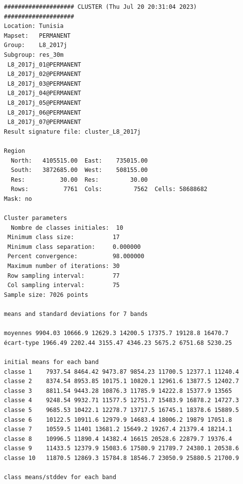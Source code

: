 \documentclass[environments,article,submit,pdftex,moreauthors]{Definitions/mdpi}
\begin{document}
\begin{scriptsize}
\begin{verbatim}
#################### CLUSTER (Thu Jul 20 20:31:04 2023) ####################
Location: Tunisia
Mapset:   PERMANENT
Group:    L8_2017j
Subgroup: res_30m
 L8_2017j_01@PERMANENT
 L8_2017j_02@PERMANENT
 L8_2017j_03@PERMANENT
 L8_2017j_04@PERMANENT
 L8_2017j_05@PERMANENT
 L8_2017j_06@PERMANENT
 L8_2017j_07@PERMANENT
Result signature file: cluster_L8_2017j

Region
  North:   4105515.00  East:    735015.00
  South:   3872685.00  West:    508155.00
  Res:          30.00  Res:         30.00
  Rows:          7761  Cols:         7562  Cells: 58688682
Mask: no

Cluster parameters
  Nombre de classes initiales: 	10
 Minimum class size:           17
 Minimum class separation:     0.000000
 Percent convergence:          98.000000
 Maximum number of iterations: 30
 Row sampling interval:        77
 Col sampling interval:        75
Sample size: 7026 points

means and standard deviations for 7 bands

moyennes 9904.03 10666.9 12629.3 14200.5 17375.7 19128.8 16470.7
écart-type 1966.49 2202.44 3155.47 4346.23 5675.2 6751.68 5230.25

initial means for each band
classe 1    7937.54 8464.42 9473.87 9854.23 11700.5 12377.1 11240.4
classe 2    8374.54 8953.85 10175.1 10820.1 12961.6 13877.5 12402.7
classe 3    8811.54 9443.28 10876.3 11785.9 14222.8 15377.9 13565
classe 4    9248.54 9932.71 11577.5 12751.7 15483.9 16878.2 14727.3
classe 5    9685.53 10422.1 12278.7 13717.5 16745.1 18378.6 15889.5
classe 6    10122.5 10911.6 12979.9 14683.4 18006.2 19879 17051.8
classe 7    10559.5 11401 13681.2 15649.2 19267.4 21379.4 18214.1
classe 8    10996.5 11890.4 14382.4 16615 20528.6 22879.7 19376.4
classe 9    11433.5 12379.9 15083.6 17580.9 21789.7 24380.1 20538.6
classe 10   11870.5 12869.3 15784.8 18546.7 23050.9 25880.5 21700.9

class means/stddev for each band


\end{verbatim}
\end{scriptsize}
\end{document}
